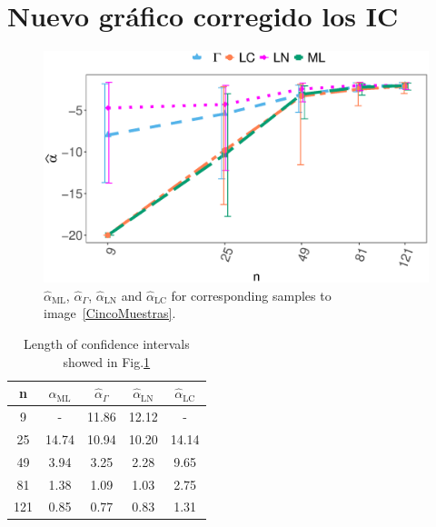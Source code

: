 \documentclass[onecolumn]{svjour3}
\begin{document}
\section{Nuevo gráfico corregido los IC}
\begin{figure}[hbt]
	\centering
	\includegraphics[width=0.7\linewidth]{../../../Figures/PaperTesis/AlfaVsTamCincoMuestrasCorregido_v2.eps}
	\caption{ $\widehat{\alpha}_{\text{{ML}}}$, $\widehat{\alpha}_{\Gamma}$, $\widehat{\alpha}_{\text{{LN}}}$ and $\widehat{\alpha}_{\text{{LC}}}$ for corresponding samples to image~\ref{CincoMuestras}.}\label{AlfaVsTamCincoMuestras}
\end{figure}

\begin{table}[htbp]
	\centering
	\caption{\label{tab:LongIC}Length of confidence intervals showed in Fig.\ref{AlfaVsTamCincoMuestras}}
	\begin{tabular}{ccccc}
		\toprule 
		n     &  $\widehat{\alpha}_{\text{{ML}}}$    &  $\widehat{\alpha}_{\Gamma}$  &  $\widehat{\alpha}_{\text{{LN}}}$ &  $\widehat{\alpha}_{\text{{LC}}}$ \\
		\midrule
		9     &    -  & 11.86 & 12.12 & - \\
		25    & 14.74 & 10.94 & 10.20 & 14.14 \\
		49    & 3.94  & 3.25  & 2.28  & 9.65 \\
		81    & 1.38  & 1.09  & 1.03  & 2.75 \\
		121   & 0.85  & 0.77  & 0.83  & 1.31 \\
		 \bottomrule
	\end{tabular}
\end{table}%

\newpage
\end{document}
